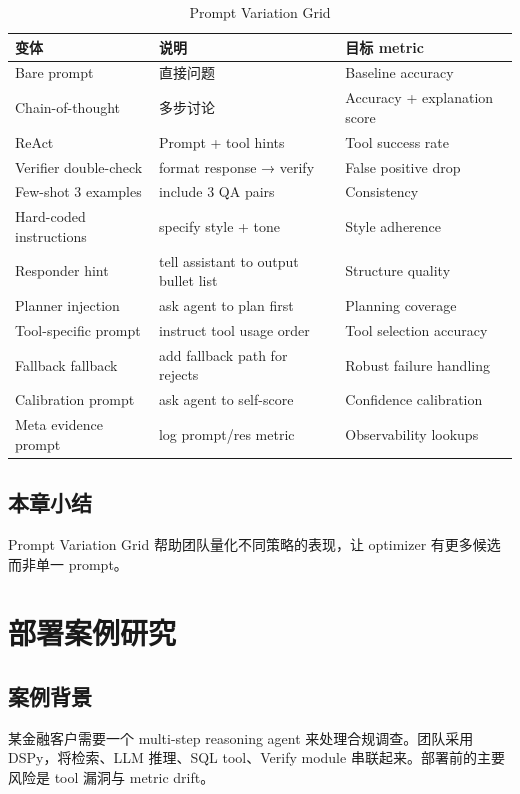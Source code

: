 \documentclass[a4paper]{article}
\begin{document}
\begin{table}[H]
\centering
\caption{Prompt Variation Grid}
\begin{tabular}{p{}p{}p{}}
\toprule
变体 & 说明 & 目标 metric \\
\midrule
Bare prompt & 直接问题 & Baseline accuracy \\
Chain-of-thought & 多步讨论 & Accuracy + explanation score \\
ReAct & Prompt + tool hints & Tool success rate \\
Verifier double-check & format response → verify & False positive drop \\
Few-shot 3 examples & include 3 QA pairs & Consistency \\
Hard-coded instructions & specify style + tone & Style adherence \\
Responder hint & tell assistant to output bullet list & Structure quality \\
Planner injection & ask agent to plan first & Planning coverage \\
Tool-specific prompt & instruct tool usage order & Tool selection accuracy \\
Fallback fallback & add fallback path for rejects & Robust failure handling \\
Calibration prompt & ask agent to self-score & Confidence calibration \\
Meta evidence prompt & log prompt/res metric & Observability lookups \\
\bottomrule
\end{tabular}
\end{table}

\subsection{本章小结}

Prompt Variation Grid 帮助团队量化不同策略的表现，让 optimizer 有更多候选而非单一 prompt。

\section{部署案例研究}

\subsection{案例背景}

某金融客户需要一个 multi-step reasoning agent 来处理合规调查。团队采用 DSPy，将检索、LLM 推理、SQL tool、Verify module 串联起来。部署前的主要风险是 tool 漏洞与 metric drift。
\end{document}
